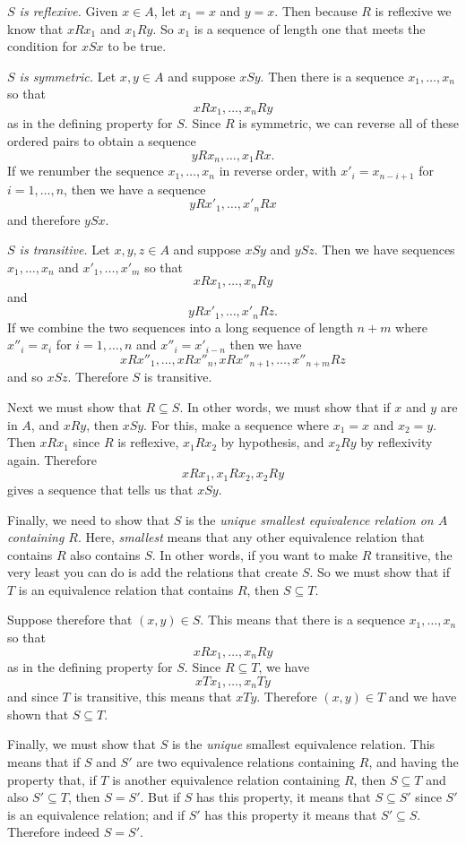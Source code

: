 \documentclass[
]{article}
\begin{document}
\emph{\(S\) is reflexive.} Given \(x\in A\), let \(x_1=x\) and \(y=x\).
Then because \(R\) is reflexive we know that \(xRx_1\) and \(x_1Ry\). So
\(x_1\) is a sequence of length one that meets the condition for \(xSx\)
to be true.

\emph{\(S\) is symmetric.} Let \(x,y\in A\) and suppose \(xSy\). Then
there is a sequence \(x_1,\ldots, x_n\) so that \[
xRx_1,\ldots, x_nRy
\] as in the defining property for \(S\). Since \(R\) is symmetric, we
can reverse all of these ordered pairs to obtain a sequence \[
yRx_n,\ldots, x_1Rx.
\] If we renumber the sequence \(x_1,\ldots, x_n\) in reverse order,
with \(x'_i=x_{n-i+1}\) for \(i=1,\ldots, n\), then we have a sequence
\[
yRx'_1,\ldots, x'_nRx
\] and therefore \(ySx\).

\emph{\(S\) is transitive.} Let \(x,y,z\in A\) and suppose \(xSy\) and
\(ySz\). Then we have sequences \(x_1,\ldots, x_n\) and
\(x'_1,\ldots, x'_m\) so that \[
xRx_1,\ldots, x_nRy
\] and \[
yRx'_1,\ldots, x'_nRz.
\] If we combine the two sequences into a long sequence of length
\(n+m\) where \(x''_i=x_i\) for \(i=1,\ldots, n\) and \(x''_i=x'_{i-n}\)
then we have \[
xRx''_1,\ldots, xRx''_n,xRx''_{n+1},\ldots, x''_{n+m}Rz
\] and so \(xSz\). Therefore \(S\) is transitive.

Next we must show that \(R\subseteq S\). In other words, we must show
that if \(x\) and \(y\) are in \(A\), and \(xRy\), then \(xSy\). For
this, make a sequence where \(x_1=x\) and \(x_2=y\). Then \(xRx_1\)
since \(R\) is reflexive, \(x_1Rx_2\) by hypothesis, and \(x_2Ry\) by
reflexivity again. Therefore \[
xRx_1, x_1Rx_2, x_2Ry
\] gives a sequence that tells us that \(xSy\).

Finally, we need to show that \(S\) is the \emph{unique smallest
equivalence relation on \(A\) containing \(R\)}. Here, \emph{smallest}
means that any other equivalence relation that contains \(R\) also
contains \(S\). In other words, if you want to make \(R\) transitive,
the very least you can do is add the relations that create \(S\). So we
must show that if \(T\) is an equivalence relation that contains \(R\),
then \(S\subseteq T\).

Suppose therefore that \((x,y)\in S\). This means that there is a
sequence \(x_1,\ldots, x_n\) so that \[
xRx_1,\ldots, x_nRy
\] as in the defining property for \(S\). Since \(R\subseteq T\), we
have \[
xTx_1,\ldots, x_nTy
\] and since \(T\) is transitive, this means that \(xTy\). Therefore
\((x,y)\in T\) and we have shown that \(S\subseteq T\).

Finally, we must show that \(S\) is the \emph{unique} smallest
equivalence relation. This means that if \(S\) and \(S'\) are two
equivalence relations containing \(R\), and having the property that, if
\(T\) is another equivalence relation containing \(R\), then
\(S\subseteq T\) and also \(S'\subseteq T\), then \(S=S'\). But if \(S\)
has this property, it means that \(S\subseteq S'\) since \(S'\) is an
equivalence relation; and if \(S'\) has this property it means that
\(S'\subseteq S\). Therefore indeed \(S=S'\).
\end{document}
